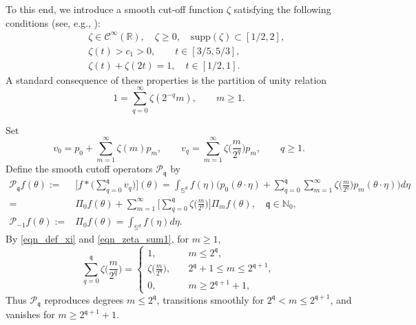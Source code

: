 \documentclass{article}
\numberwithin{equation}{section}
\def\NN{\mathbb{N}}
\def\RR{\mathbb{R}}
\def\SS{\mathbb{S}}
\def\sul{\sum\limits}
\def\mq{\mathfrak{q}}
\begin{document}
To this end, we introduce a smooth cut-off function $\zeta$ satisfying the following conditions (see, e.g., \cite[(3.6)]{petrushev2005localized}):
\begin{eqnarray}\label{eqn_def_xi}
&&\zeta\in\mathcal{C}^\infty(\RR),\quad\zeta\geq0,\quad\mathrm{supp}(\zeta)\subset[1/2,2],\\
&&\zeta(t)>c_1>0,\qquad t\in[3/5,5/3],\\
&&\zeta(t)+\zeta(2t)=1,\quad t\in[1/2,1].
\end{eqnarray}
A standard consequence of these properties is the partition of unity relation
\begin{equation}\label{eqn_zeta_sum1}
    1=\sul_{q=0}^\infty\zeta(2^{-q}m),\qquad m\geq1.
\end{equation}

\medskip
Set
\begin{equation}
    v_0=p_0+\sul_{m=1}^{\infty}\zeta(m)p_m,
    \qquad
    v_q=\sul_{m=1}^{\infty}\zeta\big(\frac{m}{2^q}\big)p_m,
    \qquad q\geq1.
\end{equation}
Define the smooth cutoff operators $\mathcal{P}_{\mq}$ by
\begin{equation}
    \begin{split}
        \mathcal{P}_{\mq}f(\theta)
        :=&\Big[f*\Big(\sul_{q=0}^\mq v_q\Big)\Big](\theta)=\int_{\SS^d}f(\eta)\Big(p_0(\theta\cdot\eta)
        +\sul_{q=0}^\mq\sul_{m=1}^{\infty}\zeta\big(\frac{m}{2^q}\big)p_m(\theta\cdot\eta)\Big)d\eta\\
        =&\Pi_0f(\theta)+\sul_{m=1}^{\infty}\Big[\sul_{q=0}^\mq\zeta\big(\frac{m}{2^q}\big)\Big]
        \Pi_mf(\theta),\quad\mq\in\NN_0,\\
        \mathcal{P}_{-1}f(\theta):=&\Pi_0f(\theta)=\int_{\SS^d}f(\eta)d\eta.
    \end{split}
\end{equation}
By \eqref{eqn_def_xi} and \eqref{eqn_zeta_sum1}, for $m\geq1$,
\begin{equation*}
    \sul_{q=0}^\mq\zeta\big(\frac{m}{2^q}\big)=\left\{\begin{array}{ll}
        1, &\quad m\leq2^{\mq},  \\
        \zeta\big(\frac{m}{2^{\mq}}\big), & \quad2^{\mq}+1\leq m\leq2^{\mq+1},\\
        0, &\quad m\geq2^{\mq+1}+1,
    \end{array}\right.
\end{equation*}
Thus $\mathcal P_{\mq}$ reproduces degrees $m\leq2^\mq$, transitions smoothly for $2^\mq<m\leq2^{\mq+1}$, and vanishes for $m\geq2^{\mq+1}+1$.
\end{document}
